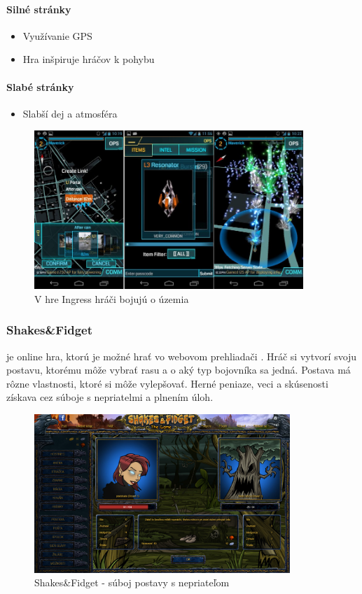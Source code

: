 \paragraph*{Silné stránky}
\begin{itemize}
  \item Využívanie GPS
  \item Hra inšpiruje hráčov k pohybu
\end{itemize}
\paragraph*{Slabé stránky}
\begin{itemize}
  \item Slabší dej a atmosféra
\end{itemize}

\begin{figure}
  \centering
  \includegraphics[height=6cm]{mainmatter/imgs/ingress.jpg}
  \caption{V hre Ingress hráči bojujú o územia}
  \label{fig:comenius}
\end{figure}



\subsubsection{Shakes\&Fidget} je online hra, ktorú je možné hrať vo webovom prehliadači \cite{sfgame}. Hráč si vytvorí svoju postavu, ktorému môže vybrať rasu a o aký typ bojovníka sa jedná. Postava má rôzne vlastnosti, ktoré si môže vylepšovať. Herné peniaze, veci a skúsenosti získava cez súboje s nepriatelmi a plnením úloh. 
\begin{figure}
  \centering
  \includegraphics[height=6cm]{mainmatter/imgs/shakes.png}
  \caption{Shakes\&Fidget - súboj postavy s nepriateľom}
  \label{fig:comenius}
\end{figure}

